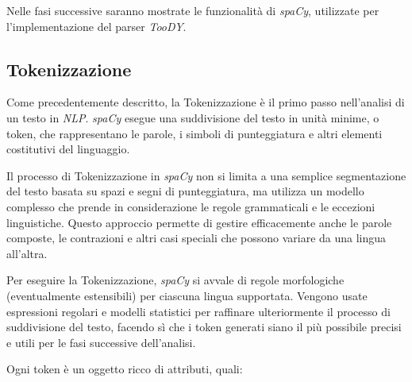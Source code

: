 \documentclass[12pt]{report}
\newcommand{\toody}{\textsl{TooDY}\xspace}
\newcommand{\spacy}{\textsl{spaCy}\xspace}
\newcommand{\nlp}{\textsl{NLP}\xspace}
\begin{document}
Nelle fasi successive saranno mostrate le funzionalità di \spacy, utilizzate per l'implementazione del parser \toody.


\subsection{Tokenizzazione}
\label{sec:tokenizzazione}
Come precedentemente descritto, la \textsf{Tokenizzazione} è il primo passo nell'analisi di un testo in \nlp. \spacy esegue una suddivisione del testo in unità minime, o token, che rappresentano le parole, i simboli di punteggiatura e altri elementi costitutivi del linguaggio.

Il processo di Tokenizzazione in \spacy non si limita a una semplice segmentazione del testo basata su spazi e segni di punteggiatura, ma utilizza un modello complesso che prende in considerazione le regole grammaticali e le eccezioni linguistiche. Questo approccio permette di gestire efficacemente anche le parole composte, le contrazioni e altri casi speciali che possono variare da una lingua all'altra.

Per eseguire la Tokenizzazione, \spacy si avvale di regole morfologiche (eventualmente estensibili) per ciascuna lingua supportata. Vengono usate espressioni regolari e modelli statistici per raffinare ulteriormente il processo di suddivisione del testo, facendo sì che i token generati siano il più possibile precisi e utili per le fasi successive dell'analisi.

Ogni token è un oggetto ricco di attributi, quali:
\end{document}
